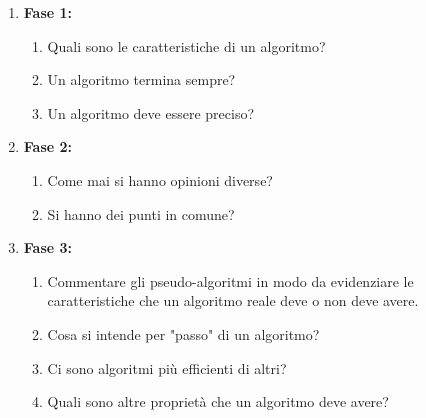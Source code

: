 \begin{enumerate}[label=\roman*.]
    \item \textbf{Fase 1:}
    \begin{enumerate}
        \item Quali sono le caratteristiche di un algoritmo?
        \item Un algoritmo termina sempre?
        \item Un algoritmo deve essere preciso?
    \end{enumerate}
    \item \textbf{Fase 2:}
    \begin{enumerate}
        \item Come mai si hanno opinioni diverse?
        \item Si hanno dei punti in comune?
    \end{enumerate}
    \item \textbf{Fase 3:}
    \begin{enumerate}
        \item Commentare gli pseudo-algoritmi in modo da evidenziare le caratteristiche che un algoritmo reale deve o non deve avere.
        \item Cosa si intende per "passo" di un algoritmo?
        \item Ci sono algoritmi più efficienti di altri?
        \item Quali sono altre proprietà che un algoritmo deve avere?
    \end{enumerate}
\end{enumerate}
